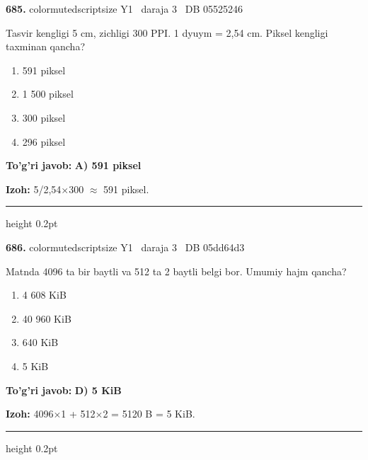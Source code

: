 \documentclass[10pt,a4paper,oneside]{article}
\begin{document}
\noindent\textbf{\color{ink}685.}  {color{muted}scriptsize Y1 \textbullet\ daraja 3 \textbullet\ DB 05525246}
\par
Tasvir kengligi 5 cm, zichligi 300 PPI. 1 dyuym = 2,54 cm. Piksel kengligi taxminan qancha?
\begin{enumerate}[label=\Alph*),leftmargin=9mm]
\item 591 piksel
\item 1 500 piksel
\item 300 piksel
\item 296 piksel
\end{enumerate}
\begin{tcolorbox}[enhanced,breakable,colback=teal!4,colframe=teal!50!black,boxrule=0.5pt,arc=1.1mm,left=3mm,right=3mm,top=1.7mm,bottom=1.7mm,before skip=2mm,after skip=2mm]
\textbf{\color{teal}To'g'ri javob:} \textbf{A) 591 piksel}
\par\smallskip
\textbf{Izoh:} 5/2,54\ensuremath{\times}300 \ensuremath{\approx} 591 piksel.
\end{tcolorbox}
\vspace{2mm}\hrule height 0.2pt \vspace{3mm}

\noindent\textbf{\color{ink}686.}  {color{muted}scriptsize Y1 \textbullet\ daraja 3 \textbullet\ DB 05dd64d3}
\par
Matnda 4096 ta bir baytli va 512 ta 2 baytli belgi bor. Umumiy hajm qancha?
\begin{enumerate}[label=\Alph*),leftmargin=9mm]
\item 4 608 KiB
\item 40 960 KiB
\item 640 KiB
\item 5 KiB
\end{enumerate}
\begin{tcolorbox}[enhanced,breakable,colback=teal!4,colframe=teal!50!black,boxrule=0.5pt,arc=1.1mm,left=3mm,right=3mm,top=1.7mm,bottom=1.7mm,before skip=2mm,after skip=2mm]
\textbf{\color{teal}To'g'ri javob:} \textbf{D) 5 KiB}
\par\smallskip
\textbf{Izoh:} 4096\ensuremath{\times}1 + 512\ensuremath{\times}2 = 5120 B = 5 KiB.
\end{tcolorbox}
\vspace{2mm}\hrule height 0.2pt \vspace{3mm}
\end{document}
